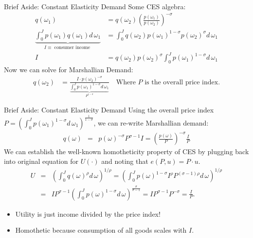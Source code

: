 \documentclass[aspectratio=169,11pt]{beamer}
\begin{document}
\begin{frame}{Brief Aside: Constant Elasticity Demand}
\small
Some CES algebra:
\begin{align*}
q(\omega_1) &= q(\omega_2) \left( \frac{p(\omega_1)}{p(\omega_2)} \right)^{-\sigma}\\
\underbrace{\int_{0}^J p(\omega_1) q(\omega_1)  d\, \omega_1}_{I \equiv \text{ consumer income }} &= \int_{0}^J q(\omega_2) p(\omega_1)^{1-\sigma} p(\omega_2)^{\sigma} d\, \omega_1\\
I &= q(\omega_2) p(\omega_2)^{\sigma}  \int_{0}^J  p(\omega_1)^{1-\sigma}  d\, \omega_1
\end{align*}
Now we can solve for Marshallian Demand:
\begin{align*}
q(\omega_2) &= \frac{I  \cdot p(\omega_2)^{-\sigma}}{\underbrace{\int_{0}^J  p(\omega_1)^{1-\sigma}  d\, \omega_1}_{P^{1-\sigma}}} \quad \text{Where $P$ is the overall price index}.
\end{align*}

\end{frame}

\begin{frame}{Brief Aside: Constant Elasticity Demand}
Using the overall price index $P =\left( \int_{0}^J  p(\omega_1)^{1-\sigma}  d\, \omega_1 \right)^{\frac{1}{1-\sigma}}$, we can re-write Marshallian demand:
\begin{eqnarray*}
q(\omega) &=& p(\omega)^{-\sigma} P^{\sigma-1} I = \left(\frac{p(\omega)}{P}\right)^{-\sigma}  \frac{I}{P}
\end{eqnarray*}
We can establish the well-known \alert{homotheticity} property of CES by plugging back into original equation for $U(\cdot)$ and noting that $e(P,u) = P \cdot u$.
\begin{eqnarray*}
U &=&\left( \int_0^J q(\omega)^\rho d\, \omega \right)^{1/\rho}  =  \left( \int_0^J  p(\omega)^{1-\sigma} I^{\rho} P^{(\sigma-1) \rho} d\, \omega \right)^{1/\rho} \\
 &=& IP^{\sigma-1}\left( \int_0^J  p(\omega)^{1-\sigma} d\, \omega \right)^{\frac{\sigma}{\sigma-1}}  = IP^{\sigma-1} P^{-\sigma}  = \frac{I}{P}.
\end{eqnarray*}
\begin{itemize}
\item Utility is just income divided by the price index!
\item Homothetic because consumption of all goods scales with $I$.
\end{itemize}
\end{frame}
\end{document}
